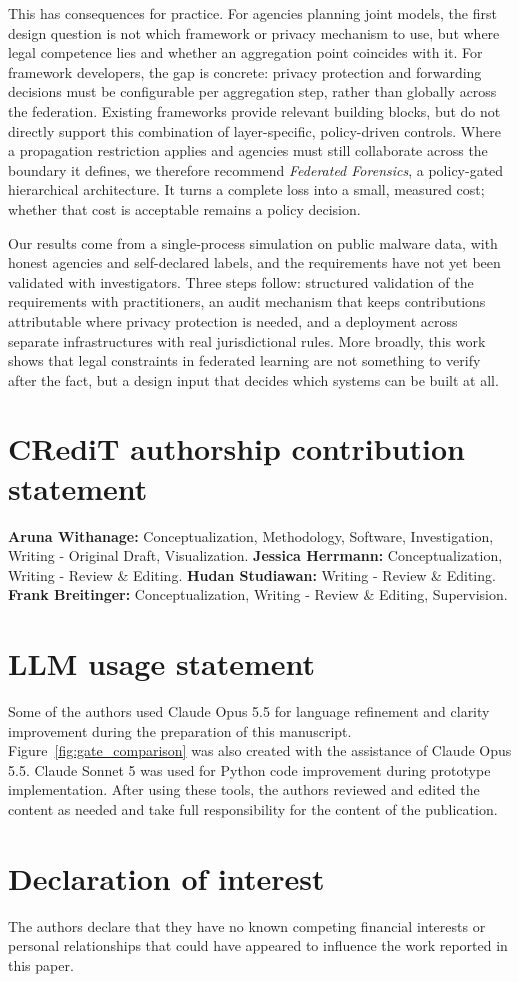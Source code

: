 \documentclass[final,5p,times,twocolumn,authoryear]{elsarticle}
\begin{document}
This has consequences for practice. For agencies planning joint models, the first design question is not which framework or privacy mechanism to use, but where legal competence lies and whether an aggregation point coincides with it. For framework developers, the gap is concrete: 
privacy protection and forwarding decisions must be configurable per aggregation step, rather than globally across the federation. Existing frameworks provide relevant building blocks, but do not directly support this combination of layer-specific, policy-driven controls.
Where a propagation restriction applies and agencies must still collaborate across the boundary it defines, we therefore recommend \emph{Federated Forensics}, a policy-gated hierarchical architecture. It turns a complete loss into a small, measured cost; whether that cost is acceptable remains a policy decision.

Our results come from a single-process simulation on public malware data, with honest agencies and self-declared labels, and the requirements have not yet been validated with investigators. Three steps follow: structured validation of the requirements with practitioners, an audit mechanism that keeps contributions attributable where privacy protection is needed, and a deployment across separate infrastructures with real jurisdictional rules. More broadly, this work shows that legal constraints in federated learning are not something to verify after the fact, but a design input that decides which systems can be built at all.

\section*{CRediT authorship contribution statement}
\textbf{Aruna Withanage:} Conceptualization, Methodology, Software, Investigation, Writing - Original Draft, Visualization. \textbf{Jessica Herrmann:} Conceptualization, Writing - Review \& Editing. \textbf{Hudan Studiawan:} Writing - Review \& Editing. \textbf{Frank Breitinger:} Conceptualization, Writing - Review \& Editing, Supervision.
\section*{LLM usage statement}
Some of the authors used Claude Opus 5.5 for language refinement and clarity improvement during the preparation of this manuscript. Figure~\ref{fig:gate_comparison} was also created with the assistance of Claude Opus 5.5. Claude Sonnet 5 was used for Python code improvement during prototype implementation. After using these tools, the authors reviewed and edited the content as needed and take full responsibility for the content of the publication.
\section*{Declaration of interest}
The authors declare that they have no known competing financial interests or personal relationships that could have appeared to influence the work reported in this paper.


\appendices






\end{document}
